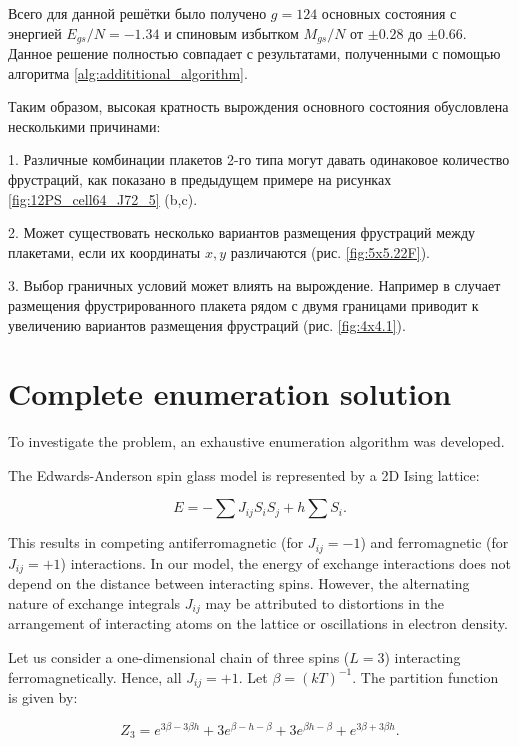 \documentclass[utf8, babel, sor, jor, amsmath, amssymb, reprint]{elsarticle} %
\begin{document}
Всего для данной решётки было получено $g=124$ основных состояния с энергией $E_{gs}/N=-1.34$ и спиновым избытком $M_{gs}/N$ от $\pm 0.28$ до $\pm 0.66$. Данное решение полностью совпадает с результатами, полученными с помощью алгоритма \ref{alg:addititional_algorithm}.

Таким образом, высокая кратность вырождения основного состояния обусловлена несколькими причинами:

1. Различные комбинации плакетов 2-го типа могут давать одинаковое количество фрустраций, как показано в предыдущем примере на рисунках \ref{fig:12PS_cell64_J72_5} (b,c).

2. Может существовать несколько вариантов размещения фрустраций между плакетами, если их координаты $x,y$ различаются (рис. \ref{fig:5x5.22F}).

3. Выбор граничных условий может влиять на вырождение. Например в случает размещения фрустрированного плакета рядом с двумя границами приводит к увеличению вариантов размещения фрустраций (рис. \ref{fig:4x4.1}).



\section{Complete enumeration solution}

To investigate the problem, an exhaustive enumeration algorithm was developed.

The Edwards-Anderson spin glass model is represented by a 2D Ising lattice:

\begin{equation}
	E = -\sum J_{ij} S_i S_j + h \sum S_i.
	\label{eq:ising_energy}
\end{equation}

This results in competing antiferromagnetic (for $J_{ij} = -1$) and ferromagnetic (for $J_{ij} = +1$) interactions. In our model, the energy of exchange interactions does not depend on the distance between interacting spins. However, the alternating nature of exchange integrals $J_{ij}$ may be attributed to distortions in the arrangement of interacting atoms on the lattice or oscillations in electron density.

Let us consider a one-dimensional chain of three spins ($L = 3$) interacting ferromagnetically. Hence, all $J_{ij} = +1$. Let $\beta = (kT)^{-1}$. The partition function is given by:

\begin{equation}
	Z_3 = e^{3\beta - 3\beta h} + 3e^{\beta - h - \beta} + 3e^{\beta h - \beta} + e^{3\beta + 3\beta h}.
	\label{eq:stat_3}
\end{equation}
\end{document}

